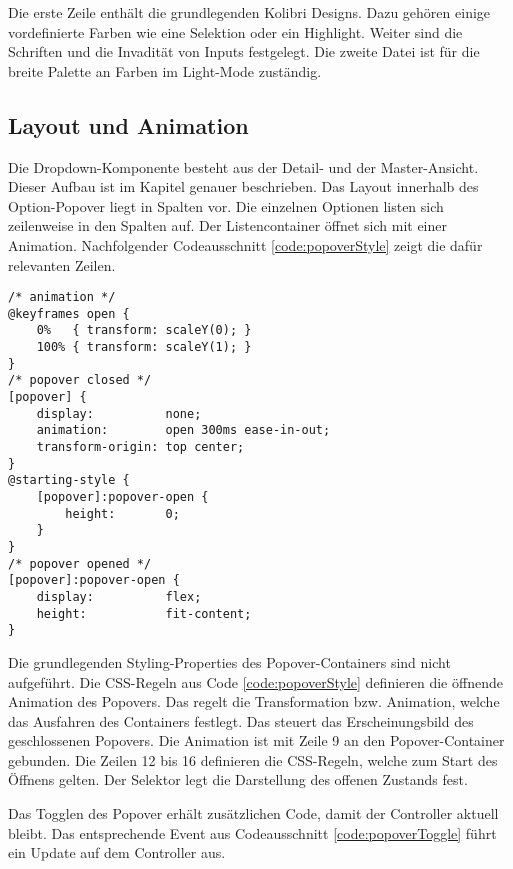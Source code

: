 Die erste Zeile enthält die grundlegenden Kolibri Designs. 
Dazu gehören einige vordefinierte Farben wie eine Selektion oder ein Highlight. 
Weiter sind die Schriften und die Invadität von Inputs festgelegt. 
Die zweite Datei ist für die breite Palette an Farben im Light-Mode zuständig. 


\subsection{Layout und Animation}
\label{sec:layoutTypo}

Die Dropdown-Komponente besteht aus der Detail- und der Master-Ansicht. 
Dieser Aufbau ist im Kapitel \textbf{} genauer beschrieben. 
Das Layout innerhalb des Option-Popover liegt in Spalten vor. 
Die einzelnen Optionen listen sich zeilenweise in den Spalten auf. 
Der Listencontainer öffnet sich mit einer Animation. 
Nachfolgender Codeausschnitt \ref{code:popoverStyle} zeigt die dafür relevanten Zeilen. 

\begin{lstlisting}[style = htmlcssjs, caption = Animation zum Öffnen des Popovers, label = code:popoverStyle]
/* animation */
@keyframes open {
    0%   { transform: scaleY(0); }
    100% { transform: scaleY(1); }
}
/* popover closed */
[popover] {
    display:          none;
    animation:        open 300ms ease-in-out;
    transform-origin: top center;
}
@starting-style {
    [popover]:popover-open {
        height:       0;
    }
}
/* popover opened */
[popover]:popover-open {
    display:          flex;
    height:           fit-content;
}
\end{lstlisting}

Die grundlegenden Styling-Properties des Popover-Containers sind nicht aufgeführt. 
Die CSS-Regeln aus Code \ref{code:popoverStyle} definieren die öffnende Animation des Popovers. 
Das  regelt die Transformation bzw. Animation, welche das Ausfahren des Containers festlegt. 
Das \codestyle{[popover]} steuert das Erscheinungsbild des geschlossenen Popovers. 
Die Animation ist mit Zeile 9 an den Popover-Container gebunden. 
Die Zeilen 12 bis 16 definieren die CSS-Regeln, welche zum Start des Öffnens gelten. 
Der Selektor  legt die Darstellung des offenen Zustands fest. 

Das Togglen des Popover erhält zusätzlichen Code, damit der Controller aktuell bleibt. 
Das entsprechende Event aus Codeausschnitt \ref{code:popoverToggle} führt ein Update auf dem Controller aus. 

